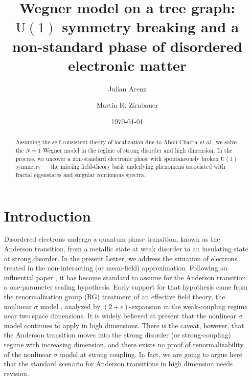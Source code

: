 \documentclass[aps,prl,twocolumn,letterpaper,superscriptaddress]{revtex4-2}
\begin{document}
\title{Wegner model on a tree graph: $\mathrm{U}(1)$ symmetry breaking and a\\ non-standard phase of disordered electronic matter}
\author{Julian Arenz}
\author{Martin R. Zirnbauer}
\date{\today}

\begin{abstract}
Assuming the self-consistent theory of localization due to Abou-Chacra {\it et al.}, we solve the $N=1$ Wegner model in the regime of strong disorder and high dimension. In the process, we uncover a non-standard electronic phase with spontaneously broken $\mathrm{U}(1)$ symmetry --- the missing field-theory basis underlying phenomena associated with fractal eigenstates and singular continuous spectra.
\end{abstract}

\maketitle

\section{Introduction}
Disordered electrons undergo a quantum phase transition, known as the Anderson transition, from a metallic state at weak disorder to an insulating state at strong disorder. In the present Letter, we address the situation of electrons treated in the non-interacting (or mean-field) approximation. Following an influential paper \cite{GangOfFour}, it has become standard to assume for the Anderson transition a one-parameter scaling hypothesis. Early support for that hypothesis came from the renormalization group (RG) treatment of an effective field theory, the nonlinear $\sigma$ model \cite{Weg79a}, analyzed by $(2+\epsilon)$-expansion in the weak-coupling regime near two space dimensions. It is widely believed at present that the nonlinear $\sigma$ model continues to apply in high dimensions. There is the caveat, however, that the Anderson transition moves into the strong disorder (or strong-coupling) regime with increasing dimension, and there exists no proof of renormalizability of the nonlinear $\sigma$ model at strong coupling. In fact, we are going to argue here that the standard scenario for Anderson transitions in high dimension needs revision.
\end{document}
